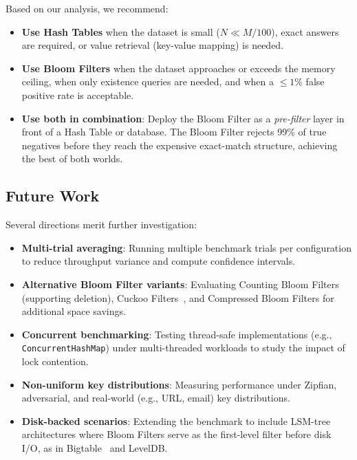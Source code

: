 Based on our analysis, we recommend:
\begin{itemize}[nosep]
    \item \textbf{Use Hash Tables} when the dataset is small ($N \ll M / 100$), exact answers are required, or value retrieval (key-value mapping) is needed.
    \item \textbf{Use Bloom Filters} when the dataset approaches or exceeds the memory ceiling, when only existence queries are needed, and when a ${\leq}1\%$ false positive rate is acceptable.
    \item \textbf{Use both in combination}: Deploy the Bloom Filter as a \emph{pre-filter} layer in front of a Hash Table or database. The Bloom Filter rejects 99\% of true negatives before they reach the expensive exact-match structure, achieving the best of both worlds.
\end{itemize}

\subsection{Future Work}

Several directions merit further investigation:
\begin{itemize}[nosep]
    \item \textbf{Multi-trial averaging}: Running multiple benchmark trials per configuration to reduce throughput variance and compute confidence intervals.
    \item \textbf{Alternative Bloom Filter variants}: Evaluating Counting Bloom Filters (supporting deletion), Cuckoo Filters~\citep{fan2014}, and Compressed Bloom Filters for additional space savings.
    \item \textbf{Concurrent benchmarking}: Testing thread-safe implementations (e.g., \texttt{ConcurrentHashMap}) under multi-threaded workloads to study the impact of lock contention.
    \item \textbf{Non-uniform key distributions}: Measuring performance under Zipfian, adversarial, and real-world (e.g., URL, email) key distributions.
    \item \textbf{Disk-backed scenarios}: Extending the benchmark to include LSM-tree architectures where Bloom Filters serve as the first-level filter before disk I/O, as in Bigtable~\citep{chang2008} and LevelDB.
\end{itemize}
